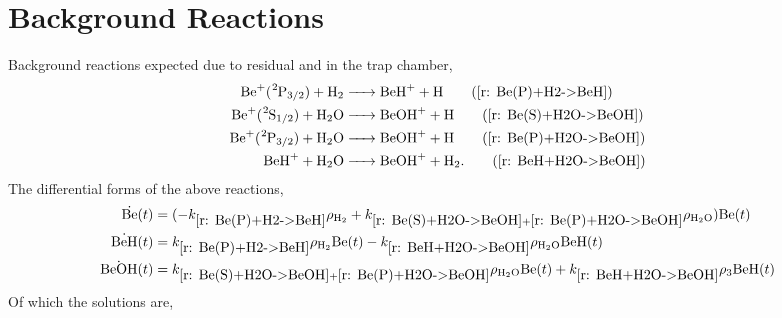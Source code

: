 \section{ Background Reactions} \label{sec: Be+H2O+H2 eqs}

Background reactions expected due to residual  and  in the trap chamber,
\begin{align*}
	\ce{Be+(^2P3/2) + H2 & -> BeH+ + H} \tag{\ref{r: Be(P)+H2->BeH}} \\
	\ce{Be+(^2S1/2) + H2O & -> BeOH+ + H} \tag{\ref{r: Be(S)+H2O->BeOH}} \\
	\ce{Be+(^2P3/2) + H2O & -> BeOH+ + H} \tag{\ref{r: Be(P)+H2O->BeOH}} \\
	\ce{BeH+ + H2O & -> BeOH+ + H2}. \tag{\ref{r: BeH+H2O->BeOH}}
\end{align*}
The differential forms of the above reactions,
\begin{align*}
	\dot{\ce{Be}}(t) & = (-k_{\ref{r: Be(P)+H2->BeH}} \rho_{\ce{H2}} + k_{\ref{r: Be(S)+H2O->BeOH} + \ref{r: Be(P)+H2O->BeOH}} \rho_{\ce{H2O}}) \ce{Be}(t) \\
	\dot{\ce{BeH}}(t) & = k_{\ref{r: Be(P)+H2->BeH}} \rho_{\ce{H2}} \ce{Be}(t) - k_{\ref{r: BeH+H2O->BeOH}} \rho_{\ce{H2O}} \ce{BeH}(t) \\
	\dot{\ce{BeOH}}(t) & = k_{\ref{r: Be(S)+H2O->BeOH} + \ref{r: Be(P)+H2O->BeOH}} \rho_{\ce{H2O}} \ce{Be}(t) + k_{\ref{r: BeH+H2O->BeOH}} \rho_3 \ce{BeH}(t)
\end{align*}
Of which the solutions are,
